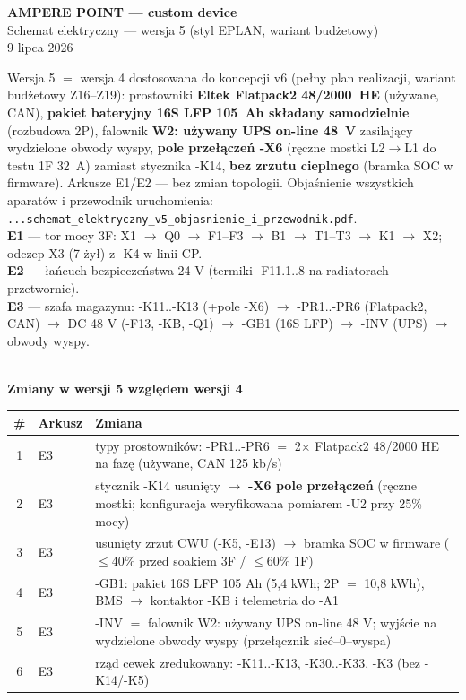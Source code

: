 \documentclass[10pt,a4paper,landscape]{article}
\begin{document}
\begin{center}
\vspace*{1.4cm}
{\LARGE\bfseries AMPERE POINT --- custom device}\\[6pt]
{\Large Schemat elektryczny --- wersja 5 (styl EPLAN, wariant budżetowy)}\\[10pt]
{\normalsize 9 lipca 2026}\\[12pt]
\begin{minipage}{0.88\textwidth}\small
Wersja 5 $=$ wersja 4 dostosowana do koncepcji v6 (pełny plan realizacji, wariant budżetowy
Z16--Z19): prostowniki \textbf{Eltek Flatpack2 48/2000~HE} (używane, CAN), \textbf{pakiet bateryjny
16S LFP 105~Ah składany samodzielnie} (rozbudowa 2P), falownik \textbf{W2: używany UPS on-line
48~V} zasilający wydzielone obwody wyspy, \textbf{pole przełączeń -X6} (ręczne mostki L2$\to$L1 do
testu 1F 32~A) zamiast stycznika -K14, \textbf{bez zrzutu cieplnego} (bramka SOC w firmware).
Arkusze E1/E2 --- bez zmian topologii. Objaśnienie wszystkich aparatów i przewodnik uruchomienia:
\texttt{...schemat\_elektryczny\_v5\_objasnienie\_i\_przewodnik.pdf}.\\[6pt]
\textbf{E1} --- tor mocy 3F: X1 $\to$ Q0 $\to$ F1--F3 $\to$ B1 $\to$ T1--T3 $\to$ K1 $\to$ X2; odczep X3 (7 żył) z -K4 w linii CP.\\
\textbf{E2} --- łańcuch bezpieczeństwa 24 V (termiki -F11.1..8 na radiatorach przetwornic).\\
\textbf{E3} --- szafa magazynu: -K11..-K13 (+pole -X6) $\to$ -PR1..-PR6 (Flatpack2, CAN) $\to$
DC 48 V (-F13, -KB, -Q1) $\to$ -GB1 (16S LFP) $\to$ -INV (UPS) $\to$ obwody wyspy.
\end{minipage}\\[10pt]
{\small\textbf{Zmiany w wersji 5 względem wersji 4}}\\[3pt]
{\scriptsize
\begin{tabular}{clp{11.6cm}}
\toprule
\# & Arkusz & Zmiana\\
\midrule
1 & E3 & typy prostowników: -PR1..-PR6 $=$ 2$\times$ Flatpack2 48/2000 HE na fazę (używane, CAN 125 kb/s)\\
2 & E3 & stycznik -K14 usunięty $\to$ \textbf{-X6 pole przełączeń} (ręczne mostki; konfiguracja weryfikowana pomiarem -U2 przy 25\% mocy)\\
3 & E3 & usunięty zrzut CWU (-K5, -E13) $\to$ bramka SOC w firmware ($\le$40\% przed soakiem 3F / $\le$60\% 1F)\\
4 & E3 & -GB1: pakiet 16S LFP 105 Ah (5,4 kWh; 2P $=$ 10,8 kWh), BMS $\to$ kontaktor -KB i telemetria do -A1\\
5 & E3 & -INV $=$ falownik W2: używany UPS on-line 48 V; wyjście na wydzielone obwody wyspy (przełącznik sieć--0--wyspa)\\
6 & E3 & rząd cewek zredukowany: -K11..-K13, -K30..-K33, -K3 (bez -K14/-K5)\\
\bottomrule
\end{tabular}}
\end{center}
\end{document}
